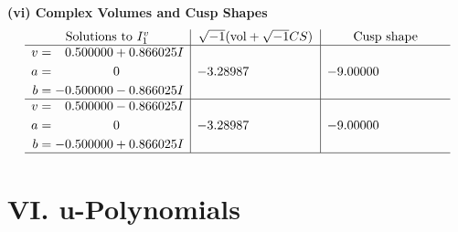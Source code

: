 \documentclass[1p]{elsarticle_modified}
\theoremstyle{definition}
\newcommand{\I}{\sqrt{-1}}
\begin{document}
\newpage\flushleft \textbf{(vi) Complex Volumes and Cusp Shapes}
$$\begin{array}{c|c|c}  
\text{Solutions to }I^v_{1}& \I (\text{vol} + \sqrt{-1}CS) & \text{Cusp shape}\\
 \hline 
\begin{aligned}
v &= \phantom{-}0.500000 + 0.866025 I \\
a &= \phantom{-0.000000 } 0 \\
b &= -0.500000 - 0.866025 I\end{aligned}
 & -3.28987\phantom{ +0.000000I} & -9.00000\phantom{ +0.000000I} \\ \hline\begin{aligned}
v &= \phantom{-}0.500000 - 0.866025 I \\
a &= \phantom{-0.000000 } 0 \\
b &= -0.500000 + 0.866025 I\end{aligned}
 & -3.28987\phantom{ +0.000000I} & -9.00000\phantom{ +0.000000I}\\
 \hline 
 \end{array}$$\newpage
\newpage\renewcommand{\arraystretch}{1}
\centering \section*{ VI. u-Polynomials}
\end{document}
